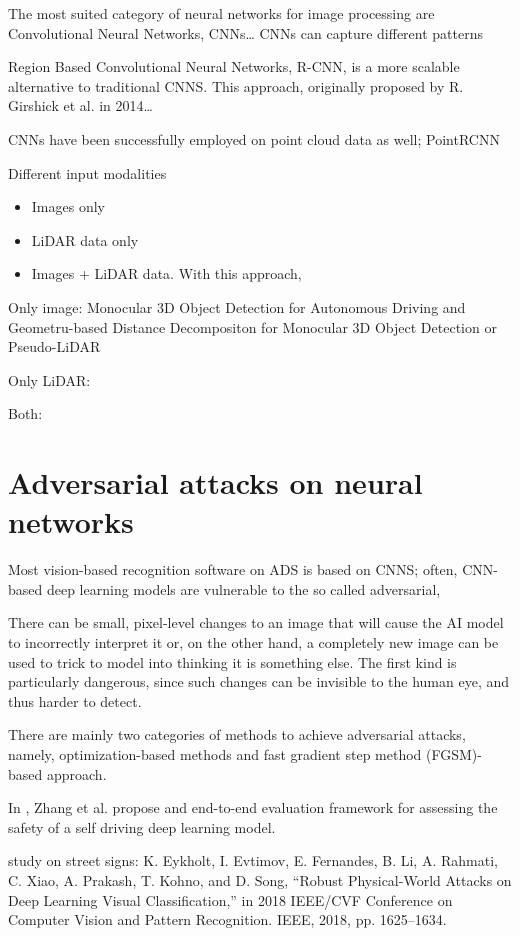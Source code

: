 The most suited category of neural networks for image processing are Convolutional Neural Networks, CNNs\dots
CNNs can capture different patterns 

Region Based Convolutional Neural Networks, R-CNN, is a more scalable alternative to traditional CNNS. This approach, originally proposed by R. Girshick et al. \cite{DBLP:conf/cvpr/GirshickDDM14} in 2014\dots

CNNs have been successfully employed on point cloud data as well; PointRCNN


Different input modalities
\begin{itemize}
    \item Images only
    \item LiDAR data only
    \item Images + LiDAR data. With this approach, 
\end{itemize}


Only image: Monocular 3D Object Detection for Autonomous Driving and Geometru-based Distance Decompositon for Monocular 3D Object Detection or Pseudo-LiDAR

Only LiDAR: 

Both:





\newpage
\section{Adversarial attacks on neural networks}
Most vision-based recognition software on ADS is based on CNNS; often, CNN-based deep learning models are vulnerable to the so called adversarial, 

There can be small, pixel-level changes to an image that will cause the AI model to incorrectly interpret it or, on the other hand, a completely new image can be used to trick to model into thinking it is something else. The first kind is particularly dangerous, since such changes can be invisible to the human eye, and thus harder to detect.

There are mainly two categories of methods to achieve adversarial attacks, namely, optimization-based methods and fast gradient step method (FGSM)-based approach.


In \cite{DBLP:journals/iotj/ZhangLWWLJ22}, Zhang et al. propose and end-to-end evaluation framework for assessing the safety of a self driving deep learning model.



study on street signs: K. Eykholt, I. Evtimov, E. Fernandes, B. Li, A. Rahmati, C. Xiao,
A. Prakash, T. Kohno, and D. Song, “Robust Physical-World Attacks on
Deep Learning Visual Classification,” in 2018 IEEE/CVF Conference on
Computer Vision and Pattern Recognition. IEEE, 2018, pp. 1625–1634.


